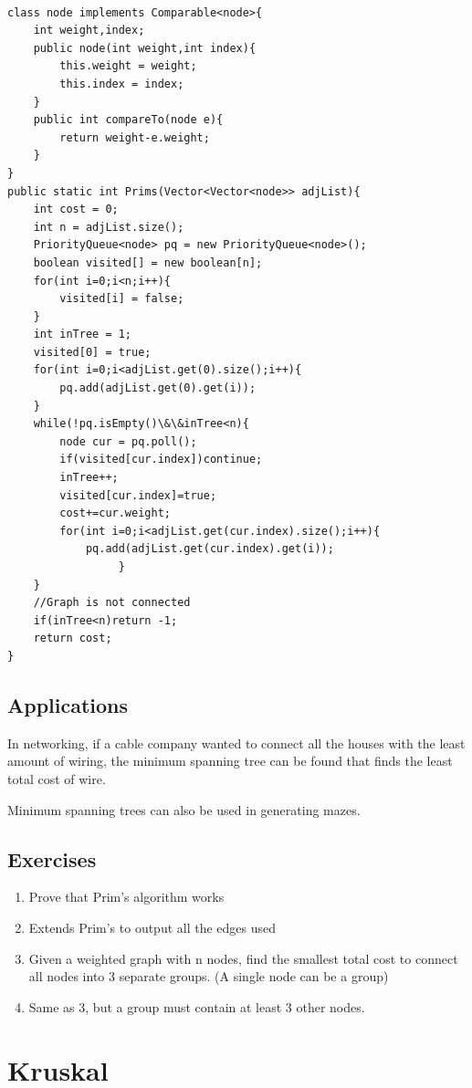 \documentclass[11pt,oneside]{book}
\begin{document}
\begin{lstlisting}

class node implements Comparable<node>{
    int weight,index;
    public node(int weight,int index){
        this.weight = weight;
        this.index = index;
    }
    public int compareTo(node e){
        return weight-e.weight;
    }
}
public static int Prims(Vector<Vector<node>> adjList){
    int cost = 0;
    int n = adjList.size();
    PriorityQueue<node> pq = new PriorityQueue<node>();
    boolean visited[] = new boolean[n];
    for(int i=0;i<n;i++){
        visited[i] = false;
    }
    int inTree = 1;
    visited[0] = true;
    for(int i=0;i<adjList.get(0).size();i++){
        pq.add(adjList.get(0).get(i));
    }
    while(!pq.isEmpty()\&\&inTree<n){
        node cur = pq.poll();
        if(visited[cur.index])continue;
        inTree++;
        visited[cur.index]=true;
        cost+=cur.weight;
        for(int i=0;i<adjList.get(cur.index).size();i++){
            pq.add(adjList.get(cur.index).get(i));          
                 }
    }
    //Graph is not connected
    if(inTree<n)return -1;
    return cost;
}
\end{lstlisting}

\subsection{Applications}

In networking, if a cable company wanted to connect all the houses with the least amount of wiring, the minimum spanning tree can be found that finds the least total cost of wire.

Minimum spanning trees can also be used in generating mazes.

\subsection{Exercises}

\begin{enumerate}
\item Prove that Prim's algorithm works
\item Extends Prim's to output all the edges used
\item Given a weighted graph with n nodes, find the smallest total cost to connect all nodes into 3 separate groups. (A single node can be a group)
\item Same as 3, but a group must contain at least 3 other nodes.
\end{enumerate}
\section{Kruskal}
\end{document}

